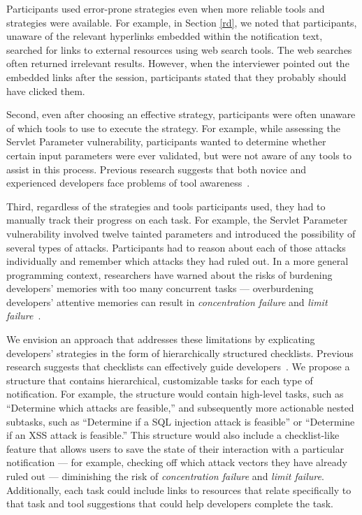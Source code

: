 \documentclass{sig-alternate}
\begin{document}
Participants used error-prone strategies even when more reliable tools and strategies were available. 
For example, in Section \ref{rd}, we noted that participants, unaware of the relevant hyperlinks embedded within the notification text, searched for links to external resources using web search tools. 
The web searches often returned irrelevant results. 
However, when the interviewer pointed out the embedded links after the session, participants stated that they probably should have clicked them. 

Second, even after choosing an effective strategy, participants were often unaware of which tools to use to execute the strategy.
For example, while assessing the Servlet Parameter vulnerability, participants wanted to determine whether certain input parameters were ever validated, but were not aware of any tools to assist in this process.
Previous research suggests that both novice and experienced developers face problems of tool awareness~\cite{murphy-Hill2012fluency}.

Third, regardless of the strategies and tools participants used, they had to manually track their progress on each task.
For example, the Servlet Parameter vulnerability involved twelve tainted parameters and introduced the possibility of several types of attacks. 
Participants had to reason about each of those attacks individually and remember which attacks they had ruled out.
In a more general programming context, researchers have warned about the risks of burdening developers' memories with too many concurrent tasks 
--- overburdening developers' attentive memories can result in \emph{concentration failure} and \emph{limit failure}~\cite{parnin2012programmer}.

We envision an approach that addresses these limitations by explicating developers' strategies in the form of hierarchically structured checklists.
Previous research suggests that checklists can effectively guide developers~\cite{phang2009triaging}.
We propose a structure that contains hierarchical, customizable tasks for each type of notification.
For example, the structure would contain high-level tasks, such as ``Determine which attacks are feasible,'' and subsequently more actionable nested subtasks, such as ``Determine if a SQL injection attack is feasible'' or ``Determine if an XSS attack is feasible.''
This structure would also include a checklist-like feature that allows users to save the state of their interaction with a particular notification --- for example, checking off which attack vectors they have already ruled out --- diminishing the risk of \emph{concentration failure} and \emph{limit failure}.
Additionally, each task could include links to resources that relate specifically to that task and tool suggestions that could help developers complete the task.
\end{document}
